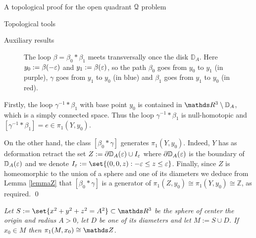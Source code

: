 \documentclass[11pt, a4paper, english, twoside, notitlepage, openright]{report}
\begin{document}
\begin{chapter}{A topological proof for the open quadrant $\mathcal{Q}$ problem}
\begin{section}{Topological tools}
\begin{subsection}{Auxiliary results}
\begin{lemma}
\begin{Proof}
\begin{figure}[ht!]
\begin{center}
\caption[The loop $\beta=\beta_0\ast\beta_1$ meets transversally once the disk ${\mathbb D}_A$.]{The loop $\beta=\beta_0\ast\beta_1$ meets transversally once the disk ${\mathbb D}_A$. Here $y_0:=\beta(-\varepsilon)$ and $y_1:=\beta(\varepsilon)$, so the path $\beta_0$ goes from $y_0$ to $y_1$ (in purple), $\gamma$ goes from $y_1$ to $y_0$ (in blue) and $\beta_1$ goes from $y_1$ to $y_0$ (in red).}\label{fig:disc}
\end{center}
\end{figure}

\vspace{1mm}

Firstly, the loop $\gamma^{-1}\ast\beta_1$ with base point $y_0$ is contained in $\R^3\setminus{\mathbb D}_A$, which is a simply connected space. Thus the loop $\gamma^{-1}*\beta_1$ is null-homotopic and $[\gamma^{-1}*\beta_1]=e \in \pi_1(Y,y_0)$.

\vspace{1mm}

On the other hand, the class $[\beta_0\ast\gamma]$ generates $\pi_1(Y,y_0)$. Indeed, $Y$ has as deformation retract the set $Z:=\partial{\mathbb D}_A(\varepsilon)\cup I_\varepsilon$ where $\partial{\mathbb D}_A(\varepsilon)$ is the boundary of ${\mathbb D}_A(\varepsilon)$ and we denote $I_\eps:=\set{(0,0,z):-\eps\le z\le\eps}$. Finally, since $Z$ is homeomorphic to the union of a sphere and one of its diameters we deduce from Lemma \ref{lemmaZ} that $[\beta_0\ast\gamma]$ is a generator of $\pi_1(Z,y_0)\cong\pi_1(Y,y_0)\cong{\mathbb Z}$, as required.
\qed 
\end{Proof}
\end{lemma}

\vspace{1mm}

\begin{lemma}\label{lemmaZ} \em Let $S:=\set{x^2+y^2+z^2=A^2}\subset\R^3$ be the sphere of center the origin and radius $A>0$, let $D$ be one of its diameters and let $M:=S\cup D$. If $x_0\in M$ then $\pi_1(M,x_0)\cong\Z$. \em 


\end{lemma}
\end{subsection}
\end{section}
\end{chapter}
\end{document}
